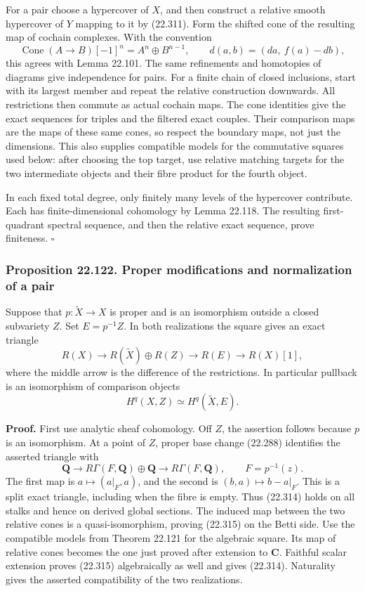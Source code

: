 \documentclass[
  11pt,
  a4paper,
]{article}
\begin{document}
For a pair choose a hypercover of \(X\), and then construct a relative
smooth hypercover of \(Y\) mapping to it by (22.311). Form the shifted
cone of the resulting map of cochain complexes. With the convention \[
 \operatorname{Cone}(A\to B)[-1]^n=A^n\oplus B^{n-1},
 \qquad d(a,b)=(da,\ f(a)-db),
 \tag{22.313}
\] this agrees with Lemma 22.101. The same refinements and homotopies of
diagrams give independence for pairs. For a finite chain of closed
inclusions, start with its largest member and repeat the relative
construction downwards. All restrictions then commute as actual cochain
maps. The cone identities give the exact sequences for triples and the
filtered exact couples. Their comparison maps are the maps of these same
cones, so respect the boundary maps, not just the dimensions. This also
supplies compatible models for the commutative squares used below: after
choosing the top target, use relative matching targets for the two
intermediate objects and their fibre product for the fourth object.

In each fixed total degree, only finitely many levels of the hypercover
contribute. Each has finite-dimensional cohomology by Lemma 22.118. The
resulting first-quadrant spectral sequence, and then the relative exact
sequence, prove finiteness. \(\square\)

\subsubsection{Proposition 22.122. Proper modifications and
normalization of a
pair}\label{proposition-22.122.-proper-modifications-and-normalization-of-a-pair}

Suppose that \(p:\widetilde X\to X\) is proper and is an isomorphism
outside a closed subvariety \(Z\). Set \(E=p^{-1}Z\). In both
realizations the square gives an exact triangle \[
 R(X)\longrightarrow R(\widetilde X)\oplus R(Z)
       \longrightarrow R(E)\longrightarrow R(X)[1],
 \tag{22.314}
\] where the middle arrow is the difference of the restrictions. In
particular pullback is an isomorphism of comparison objects \[
 H^q(X,Z)\simeq H^q(\widetilde X,E).
 \tag{22.315}
\]

\textbf{Proof.} First use analytic sheaf cohomology. Off \(Z\), the
assertion follows because \(p\) is an isomorphism. At a point of \(Z\),
proper base change (22.288) identifies the asserted triangle with \[
 \mathbf Q\longrightarrow R\Gamma(F,\mathbf Q)\oplus\mathbf Q
                    \longrightarrow R\Gamma(F,\mathbf Q),
 \qquad F=p^{-1}(z).
 \tag{22.316}
\] The first map is \(a\mapsto(a|_F,a)\), and the second is
\((b,a)\mapsto b-a|_F\). This is a split exact triangle, including when
the fibre is empty. Thus (22.314) holds on all stalks and hence on
derived global sections. The induced map between the two relative cones
is a quasi-isomorphism, proving (22.315) on the Betti side. Use the
compatible models from Theorem 22.121 for the algebraic square. Its map
of relative cones becomes the one just proved after extension to
\(\mathbf C\). Faithful scalar extension proves (22.315) algebraically
as well and gives (22.314). Naturality gives the asserted compatibility
of the two realizations.
\end{document}
